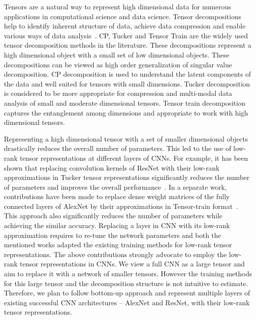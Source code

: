 \documentclass[11pt]{article}
\begin{document}
Tensors are a natural way to represent high dimensional data for numerous applications in computational science and data science. Tensor decompositions help to identify inherent structure of data, achieve data compression and enable various ways of data analysis~\cite{KB-SIAMReview2009}. CP, Tucker and Tensor Train are the widely used tensor decomposition methods in the literature. These decompositions represent a high dimensional object with a small set of low dimensional objects. These decompositions can be viewed as high order generalization of singular value decomposition. CP decomposition is used to understand the latent components of the data and well suited for tensors with small dimensions. Tucker decomposition is considered to be more appropriate for compression and multi-modal data analysis of small and moderate dimensional tensors. Tensor train decomposition captures the entanglement among dimensions and appropriate to work with high dimensional tensors.

Representing a high dimensional tensor with a set of smaller dimensional objects drastically reduces the overall number of parameters. This led to the use of low-rank tensor representations at different layers of CNNs. For example, it has been shown that replacing convolution kernels of ResNet with their low-rank approximations in Tucker tensor representations significantly reduces the number of parameters and improves the overall performance~\cite{PSSEG+-ECCV2020}. In a separate work, contributions have been made to replace dense weight matrices of the fully connected layers of AlexNet by their approximations in Tensor-train format~\cite{NPOV-NIPS2015}. This approach also significantly reduces the number of parameters while achieving the similar accuracy. Replacing a layer in CNN with its low-rank approximation requires to re-tune the network parameters and both the mentioned works adapted the existing training methods for low-rank tensor representations. The above contributions strongly advocate to employ the low-rank tensor representations in CNNs. We view a full CNN as a large tensor and aim to replace it with a network of smaller tensors. However the training methods for this large tensor and the decomposition structure is not intuitive to estimate. Therefore, we plan to follow bottom-up approach and represent multiple layers of existing successful CNN architectures -- AlexNet and ResNet, with their low-rank tensor representations.
\end{document}
